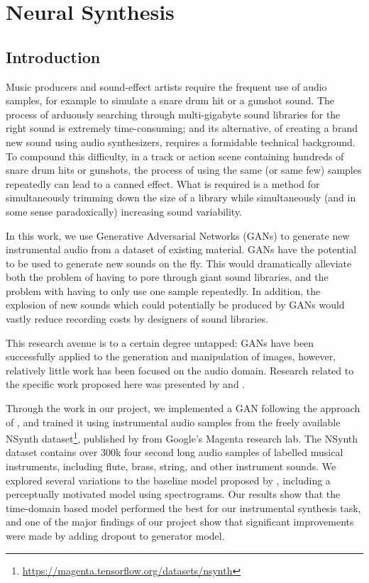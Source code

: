 \graphicspath{{./}{./figures/}{./figures/neural/}}

\chapter{Neural Synthesis}

\section{Introduction}
Music producers and sound-effect artists require the frequent use of audio samples, for example to simulate a snare drum hit or a gunshot sound. The process of arduously searching through multi-gigabyte sound libraries for the right sound is extremely time-consuming; and its alternative, of creating a brand new sound using audio synthesizers, requires a formidable technical background. To compound this difficulty, in a track or action scene containing hundreds of snare drum hits or gunshots, the process of using the same (or same few) samples repeatedly can lead to a canned effect. What is required is a method for simultaneously trimming down the size of a library while simultaneously (and in some sense paradoxically) increasing sound variability.

In this work, we use Generative Adversarial Networks (GANs) \cite{goodfellow2014generative} to generate new instrumental audio from a dataset of existing material. GANs have the potential to be used to generate new sounds on the fly. This would dramatically alleviate both the problem of having to pore through giant sound libraries, and the problem with having to only use one sample repeatedly. In addition, the explosion of new sounds which could potentially be produced by GANs would vastly reduce recording costs by designers of sound libraries.

This research avenue is to a certain degree untapped: GANs have been successfully applied to the generation and manipulation of images, however, relatively little work has been focused on the audio domain. Research related to the specific work proposed here was presented by \cite{donahue2018adversarial}  and \cite{engel2018gansynth}.

Through the work in our project, we implemented a GAN following the approach of \cite{donahue2018adversarial}, and trained it using instrumental audio samples from the freely available NSynth dataset\footnote{\url{https://magenta.tensorflow.org/datasets/nsynth}}, published by \cite{nsynth2017} from Google's Magenta research lab. The NSynth dataset contains over 300k four second long audio samples of labelled musical instruments, including flute, brass, string, and other instrument sounds. We explored several variations to the baseline model proposed by \cite{donahue2018adversarial}, including a perceptually motivated model using spectrograms. Our results show that the time-domain based model performed the best for our instrumental synthesis task, and one of the major findings of our project show that significant improvements were made by adding dropout to generator model.

